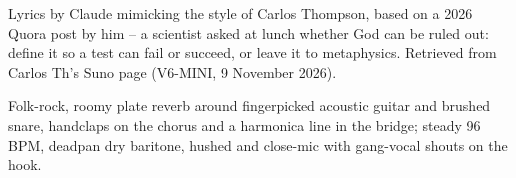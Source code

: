 
\label{sec:ask-someone-with-the-skill}
\begin{notes}
Lyrics by Claude mimicking the style of Carlos Thompson, based on a 2026 Quora post by him -- a scientist asked at lunch whether God can be ruled out: define it so a test can fail or succeed, or leave it to metaphysics. Retrieved from Carlos Th's Suno page (V6-MINI, 9 November 2026).
\end{notes}
\begin{style}
Folk-rock, roomy plate reverb around fingerpicked acoustic guitar and brushed snare, handclaps on the chorus and a harmonica line in the bridge; steady 96 BPM, deadpan dry baritone, hushed and close-mic with gang-vocal shouts on the hook.
\end{style}
